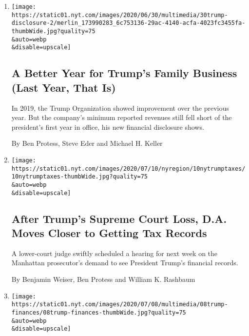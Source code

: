 \begin{enumerate}
\def\labelenumi{\arabic{enumi}.}
\item
  \href{/2020/07/31/business/trump-financial-disclosure.html}{}

  \texttt{[image: https://static01.nyt.com/images/2020/06/30/multimedia/30trump-disclosure-2/merlin\_173990283\_6c753136-29ac-4140-acfa-4023fc3455fa-thumbWide.jpg?quality=75\\\&auto=webp\\\&disable=upscale]}

  \hypertarget{a-better-year-for-trumps-family-business-last-year-that-is}{%
  \subsection{A Better Year for Trump's Family Business (Last Year, That
  Is)}\label{a-better-year-for-trumps-family-business-last-year-that-is}}

  In 2019, the Trump Organization showed improvement over the previous
  year. But the company's minimum reported revenues still fell short of
  the president's first year in office, his new financial disclosure
  shows.

  By Ben Protess, Steve Eder and Michael H. Keller
\item
  \href{/2020/07/10/nyregion/donald-trump-taxes-cy-vance.html}{}

  \texttt{[image: https://static01.nyt.com/images/2020/07/10/nyregion/10nytrumptaxes/10nytrumptaxes-thumbWide.jpg?quality=75\\\&auto=webp\\\&disable=upscale]}

  \hypertarget{after-trumps-supreme-court-loss-da-moves-closer-to-getting-tax-records}{%
  \subsection{After Trump's Supreme Court Loss, D.A. Moves Closer to
  Getting Tax
  Records}\label{after-trumps-supreme-court-loss-da-moves-closer-to-getting-tax-records}}

  A lower-court judge swiftly scheduled a hearing for next week on the
  Manhattan prosecutor's demand to see President Trump's financial
  records.

  By Benjamin Weiser, Ben Protess and William K. Rashbaum
\item
  \href{/2020/07/08/us/politics/trump-financial-disclosure.html}{}

  \texttt{[image: https://static01.nyt.com/images/2020/07/08/multimedia/08trump-finances/08trump-finances-thumbWide.jpg?quality=75\\\&auto=webp\\\&disable=upscale]}


\end{enumerate}
